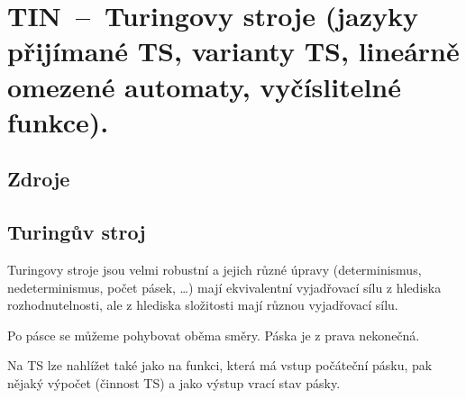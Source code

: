 

\graphicspath{{tin/turingovy_stroje/figures}}


\chapter{TIN~--~Turingovy stroje (jazyky přijímané TS, varianty TS, lineárně omezené automaty, vyčíslitelné funkce).}


\section{Zdroje}

\begin{compactitem}
    \item {}
    \item {}
    \item {}
    \item {}
    \item {}
\end{compactitem}


\section{Turingův stroj}

\begin{compactitem}
    \item Turingovy stroje jsou velmi robustní a jejich různé úpravy (determinismus, nedeterminismus, počet pásek, \dots) mají ekvivalentní vyjadřovací sílu z hlediska rozhodnutelnosti, ale z hlediska složitosti mají různou vyjadřovací sílu.

    \item Po pásce se můžeme pohybovat oběma směry. Páska je z prava nekonečná.

    \item Na TS lze nahlížet také jako na funkci, která má vstup počáteční pásku, pak nějaký výpočet (činnost TS) a jako výstup vrací stav pásky.
\end{compactitem}

